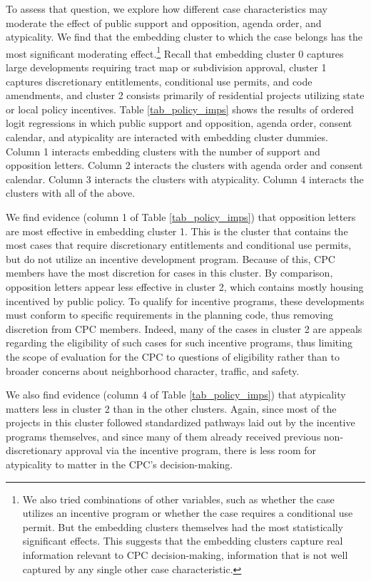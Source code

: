 To assess that question, we explore how different case characteristics may moderate the effect of public support and opposition, agenda order, and atypicality. We find that the embedding cluster to which the case belongs has the most significant moderating effect.\footnote{We also tried combinations of other variables, such as whether the case utilizes an incentive program or whether the case requires a conditional use permit. But the embedding clusters themselves had the most statistically significant effects. This suggests that the embedding clusters capture real information relevant to CPC decision-making, information that is not well captured by any single other case characteristic.} Recall that embedding cluster 0 captures large developments requiring tract map or subdivision approval, cluster 1 captures discretionary entitlements, conditional use permits, and code amendments, and cluster 2 consists primarily of residential projects utilizing state or local policy incentives. Table \ref{tab_policy_imps} shows the results of ordered logit regressions in which public support and opposition, agenda order, consent calendar, and atypicality are interacted with embedding cluster dummies. Column 1 interacts embedding clusters with the number of support and opposition letters. Column 2 interacts the clusters with agenda order and consent calendar. Column 3 interacts the clusters with atypicality. Column 4 interacts the clusters with all of the above. 

We find evidence (column 1 of Table \ref{tab_policy_imps}) that opposition letters are most effective in embedding cluster 1. This is the cluster that contains the most cases that require discretionary entitlements and conditional use permits, but do not utilize an incentive development program. Because of this, CPC members have the most discretion for cases in this cluster. By comparison, opposition letters appear less effective in cluster 2, which contains mostly housing incentived by public policy. To qualify for incentive programs, these developments must conform to specific requirements in the planning code, thus removing discretion from CPC members. Indeed, many of the cases in cluster 2 are appeals regarding the eligibility of such cases for such incentive programs, thus limiting the scope of evaluation for the CPC to questions of eligibility rather than to broader concerns about neighborhood character, traffic, and safety. 

We also find evidence (column 4 of Table \ref{tab_policy_imps}) that atypicality matters less in cluster 2 than in the other clusters. Again, since most of the projects in this cluster followed standardized pathways laid out by the incentive programs themselves, and since many of them already received previous non-discretionary approval via the incentive program, there is less room for atypicality to matter in the CPC's decision-making.

